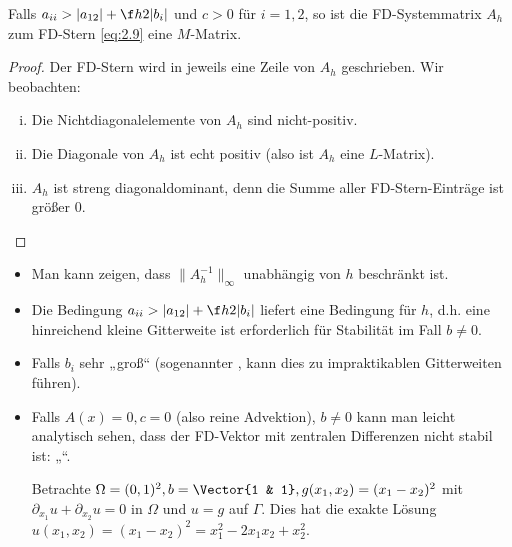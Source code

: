 \begin{kor} \label{2.31}
	Falls $a_{ii} > |a_{12}| + \f h2 |b_i|$ und $c > 0$ für $i= 1,2$, so ist die FD-Systemmatrix $A_h$ zum FD-Stern \eqref{eq:2.9} eine $M$-Matrix.
	\begin{proof}
		Der FD-Stern wird in jeweils eine Zeile von $A_h$ geschrieben.
		Wir beobachten:
		\begin{enumerate}[i)]
			\item
				Die Nichtdiagonalelemente von $A_h$ sind nicht-positiv.
			\item
				Die Diagonale von $A_h$ ist echt positiv (also ist $A_h$ eine $L$-Matrix).
			\item
				$A_h$ ist streng diagonaldominant, denn die Summe aller FD-Stern-Einträge ist größer 0.
		\end{enumerate}
	\end{proof}
	\begin{note}
		\begin{itemize}
			\item
				Man kann zeigen, dass $\|A_h^{-1}\|_\infty$ unabhängig von $h$ beschränkt ist.
			\item
				Die Bedingung $a_{ii} > |a_{12}| + \f h2 |b_i|$ liefert eine Bedingung für $h$, d.h. eine hinreichend kleine Gitterweite ist erforderlich für Stabilität im Fall $b \neq 0$.
			\item
				Falls $b_i$ sehr „groß“ (sogenannter , kann dies zu impraktikablen Gitterweiten führen).
			\item
				Falls $A(x) = 0, c = 0$ (also reine Advektion), $b \neq 0$ kann man leicht analytisch sehen, dass der FD-Vektor mit zentralen Differenzen nicht stabil ist: „“.

				Betrachte $\Omega = (0,1)^2, b = \Vector{1 & 1}, g(x_1, x_2) = (x_1 - x_2)^2$ mit $\partial_{x_1} u + \partial_{x_2} u = 0$ in $\Omega$ und $u = g$ auf $\Gamma$.
				Dies hat die exakte Lösung $u(x_1, x_2) = (x_1 - x_2)^2 = x_1^2 - 2x_1x_2 + x_2^2$.


\end{itemize}
\end{note}
\end{kor}
